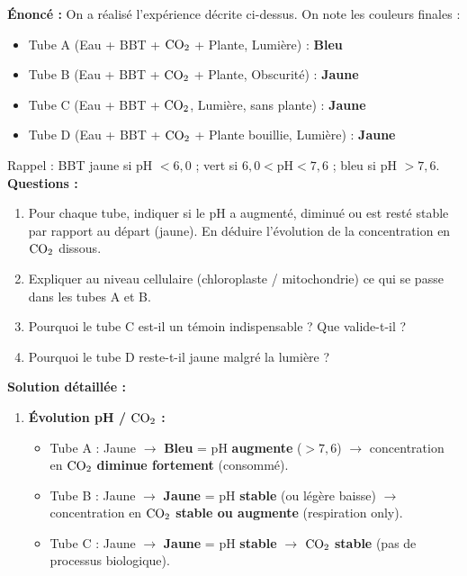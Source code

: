 \documentclass[11pt]{article}
\begin{document}
\begin{exoresolu}
    \textbf{Énoncé :} On a réalisé l'expérience décrite ci-dessus. On note les couleurs finales :
    \begin{itemize}
        \item Tube A (Eau + BBT + $\ce{CO2}$ + Plante, Lumière) : \textbf{Bleu}
        \item Tube B (Eau + BBT + $\ce{CO2}$ + Plante, Obscurité) : \textbf{Jaune}
        \item Tube C (Eau + BBT + $\ce{CO2}$, Lumière, sans plante) : \textbf{Jaune}
        \item Tube D (Eau + BBT + $\ce{CO2}$ + Plante bouillie, Lumière) : \textbf{Jaune}
    \end{itemize}
    Rappel : BBT jaune si pH $< 6,0$ ; vert si $6,0 < \text{pH} < 7,6$ ; bleu si pH $> 7,6$.
    \textbf{Questions :}
    \begin{enumerate}
        \item Pour chaque tube, indiquer si le pH a augmenté, diminué ou est resté stable par rapport au départ (jaune). En déduire l'évolution de la concentration en $\ce{CO2}$ dissous.
        \item Expliquer au niveau cellulaire (chloroplaste / mitochondrie) ce qui se passe dans les tubes A et B.
        \item Pourquoi le tube C est-il un témoin indispensable ? Que valide-t-il ?
        \item Pourquoi le tube D reste-t-il jaune malgré la lumière ?
    \end{enumerate}
    \tcblower
    \textbf{Solution détaillée :}
    \begin{enumerate}
        \item \textbf{Évolution pH / $\ce{CO2}$ :}
            \begin{itemize}
                \item Tube A : Jaune $\rightarrow$ \textbf{Bleu} = pH \textbf{augmente} ($> 7,6$) $\rightarrow$ concentration en $\ce{CO2}$ \textbf{diminue fortement} (consommé).
                \item Tube B : Jaune $\rightarrow$ \textbf{Jaune} = pH \textbf{stable} (ou légère baisse) $\rightarrow$ concentration en $\ce{CO2}$ \textbf{stable ou augmente} (respiration only).
                \item Tube C : Jaune $\rightarrow$ \textbf{Jaune} = pH \textbf{stable} $\rightarrow$ $\ce{CO2}$ \textbf{stable} (pas de processus biologique).

\end{itemize}
\end{enumerate}
\end{exoresolu}
\end{document}
